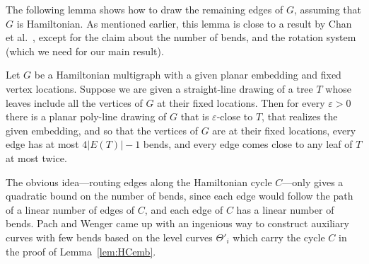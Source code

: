 \documentclass{llncs}
\begin{document}
The following lemma shows how to draw the remaining edges of $G$, assuming that $G$ is Hamiltonian. As mentioned earlier, this lemma is close to a result by Chan et al.~\cite{CHKL13}, except for the claim about the number of bends, and the rotation system (which we need for our main result).

\begin{lemma}\label{lem:Te}
Let $G$ be a Hamiltonian multigraph with a given planar embedding and fixed vertex locations. Suppose we are given a straight-line drawing of a tree $T$ whose leaves include all the vertices of $G$ at their fixed locations. Then for every $\varepsilon > 0$ there is a planar poly-line drawing of $G$ that is $\varepsilon$-close to $T$, that realizes the given embedding, and so that the vertices of $G$ are at their fixed locations, every edge has at most $4|E(T)|-1$ bends, and every edge comes close to any leaf of $T$ at most twice.
\end{lemma}

The obvious idea---routing edges along the Hamiltonian cycle $C$---only gives a quadratic bound on the number of bends, since each edge would follow the path of a linear number of edges of $C$, and each edge of $C$ has a linear number of bends. Pach and Wenger came up with an ingenious way to construct auxiliary curves with few bends based on the level curves $\Theta'_i$ which carry the cycle $C$ in the proof of Lemma~\ref{lem:HCemb}.
\end{document}
